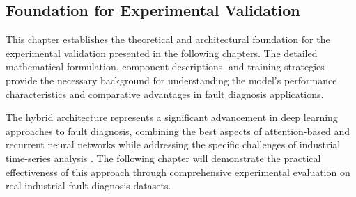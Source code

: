 \subsection{Foundation for Experimental Validation}
\label{subsec:foundation_experimental}

This chapter establishes the theoretical and architectural foundation for the experimental validation presented in the following chapters. The detailed mathematical formulation, component descriptions, and training strategies provide the necessary background for understanding the model's performance characteristics and comparative advantages in fault diagnosis applications.

The hybrid architecture represents a significant advancement in deep learning approaches to fault diagnosis, combining the best aspects of attention-based and recurrent neural networks while addressing the specific challenges of industrial time-series analysis \citep{lei2020applications, zhang2019deep}. The following chapter will demonstrate the practical effectiveness of this approach through comprehensive experimental evaluation on real industrial fault diagnosis datasets.

